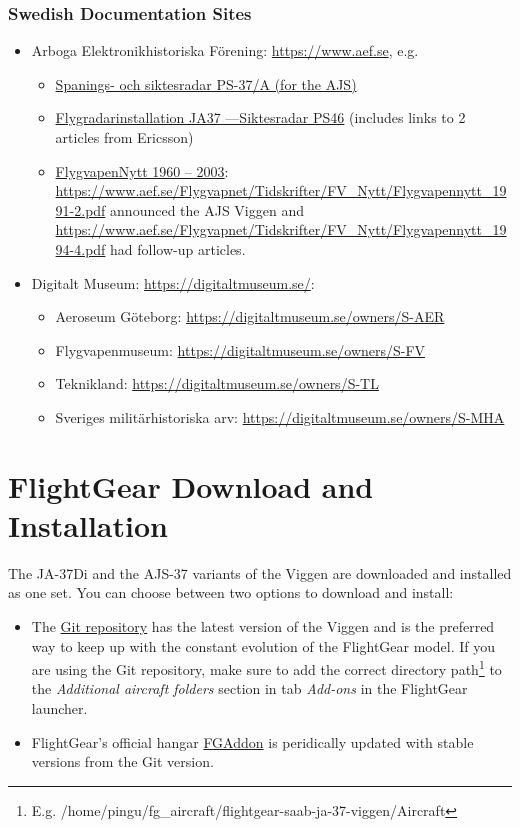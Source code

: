 \subsection{Swedish Documentation Sites}
\begin{itemize}
\item Arboga Elektronikhistoriska Förening: \url{https://www.aef.se}, e.g. 
\begin{itemize}
\item \href{https://www.aef.se/Avionik/Notiser/PS-37/PS-37A.htm}{Spanings- och siktesradar PS-37/A (for the AJS)}
\item \href{https://www.aef.se/Avionik/Notiser/Siktesradar_PS-46_1.htm}{Flygradarinstallation JA37 ---Siktesradar PS46} (includes links to 2 articles from Ericsson)
\item \href{https://www.aef.se/Flygvapnet/Tidskrifter/FV_Nytt/FVN_oversikt.htm}{FlygvapenNytt 1960 – 2003}: \url{https://www.aef.se/Flygvapnet/Tidskrifter/FV_Nytt/Flygvapennytt_1991-2.pdf} announced the AJS Viggen and \url{https://www.aef.se/Flygvapnet/Tidskrifter/FV_Nytt/Flygvapennytt_1994-4.pdf} had follow-up articles.
\end{itemize}
\item Digitalt Museum: \url{https://digitaltmuseum.se/}:
\begin{itemize}
\item Aeroseum Göteborg: \url{https://digitaltmuseum.se/owners/S-AER}
\item Flygvapenmuseum: \url{https://digitaltmuseum.se/owners/S-FV}
\item Teknikland: \url{https://digitaltmuseum.se/owners/S-TL}
\item Sveriges militärhistoriska arv: \url{https://digitaltmuseum.se/owners/S-MHA}
\end{itemize}
\end{itemize} 

\chapter{FlightGear Download and Installation}
The JA-37Di and the AJS-37 variants of the Viggen are downloaded and installed as one set. You can choose between two options to download and install:
\begin{itemize}
\item The \href{https://github.com/NikolaiVChr/flightgear-saab-ja-37-viggen}{Git repository} has the latest version of the Viggen and is the preferred way to keep up with the constant evolution of the FlightGear model. If you are using the Git repository, make sure to add the correct directory path\footnote{E.g. /home/pingu/fg\_aircraft/flightgear-saab-ja-37-viggen/Aircraft} to the \emph{Additional aircraft folders} section in tab \emph{Add-ons} in the FlightGear launcher.
\item FlightGear's official hangar \href{http://wiki.flightgear.org/FGAddon}{FGAddon} is peridically updated with stable versions from the Git version. 
\end{itemize}

